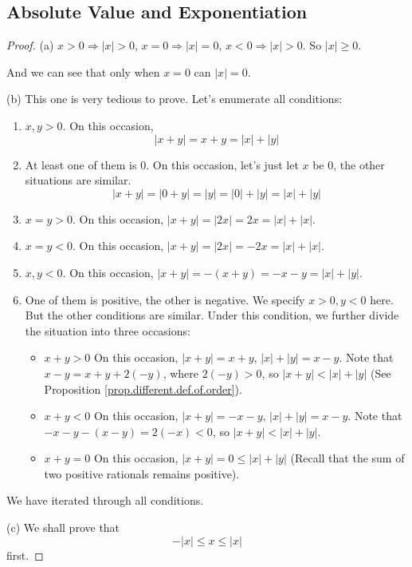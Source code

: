 \subsection{Absolute Value and Exponentiation}
\begin{proof}
(a)
$x>0 \Rightarrow |x| >0$, $x=0\Rightarrow |x|=0$, $x<0 \Rightarrow |x| >0$. So $|x| \geq 0$.

And we can see that only when $x=0$ can $|x| = 0$.

(b)
This one is very tedious to prove. Let's enumerate all conditions:
\begin{enumerate}
\item $x,y>0$. On this occasion, 
\[
|x+y| = x+y = |x|+|y|
\]

\item At least one of them is $0$. On this occasion, let's just let $x$ be 0, the other 
situations are similar.
\[
|x+y| = |0+y| = |y| = |0| + |y| = |x| + |y|
\]

\item $x=y>0$. On this occasion, $|x+y| = |2x| = 2x = |x|+|x|$.

\item $x=y<0$. On this occasion, $|x+y| = |2x| = -2x = |x|+|x|$.

\item $x,y<0$. On this occasion, $|x+y| = -(x+y) = -x -y = |x| + |y|$.

\item One of them is positive, the other is negative. We specify $x>0,y<0$ here. But the other conditions 
are similar. Under this condition, we further divide the situation into three occasions:
\begin{itemize}
\item $x+y>0$ On this occasion, $|x+y| = x+y$, $|x| + |y| = x-y$. Note that $x-y = x+y +2(-y)$, where 
$2(-y) >0$, so $|x+y| < |x|+|y|$ (See Proposition \ref{prop.different.def.of.order}).
\item $x+y<0$ On this occasion, $|x+y| = -x-y$, $|x|+|y|=x-y$. Note that $-x-y - (x-y) = 2(-x) < 0$, so 
$|x+y| < |x| + |y|$.
\item $x+y=0$ On this occasion, $|x+y| = 0 \leq |x| + |y|$ (Recall that the sum of two positive rationals 
remains positive).
\end{itemize}
\end{enumerate}

We have iterated through all conditions.

(c)
We shall prove that 
\[
-|x| \leq x \leq |x|
\]
first.


\end{proof}
